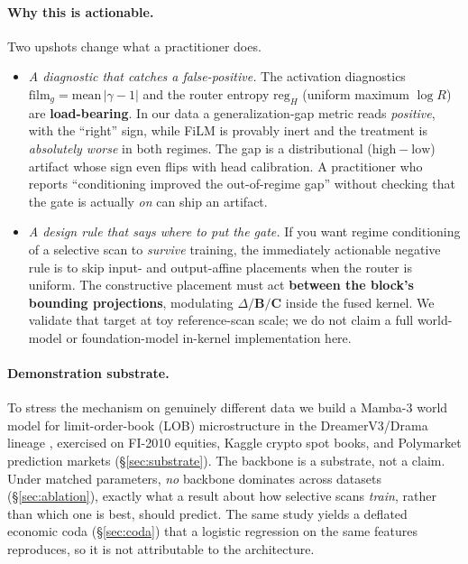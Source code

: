 \documentclass{article}
\begin{document}
\paragraph{Why this is actionable.}
Two upshots change what a practitioner does.
\begin{itemize}[nosep,leftmargin=1.4em]
\item \emph{A diagnostic that catches a false-positive.} The activation
  diagnostics $\mathrm{film}_g=\mathrm{mean}\,|\gamma-1|$ and the router entropy
  $\mathrm{reg}_H$ (uniform maximum $\log R$) are \textbf{load-bearing}. In our
  data a generalization-gap metric reads \emph{positive}, with the ``right'' sign,
  while FiLM is provably inert and the treatment is \emph{absolutely worse} in both
  regimes. The gap is a distributional ($\mathrm{high}-\mathrm{low}$) artifact
  whose sign even flips with head calibration. A practitioner who reports
  ``conditioning improved the out-of-regime gap'' without checking that the gate is
  actually \emph{on} can ship an artifact.
\item \emph{A design rule that says where to put the gate.} If you want regime
  conditioning of a selective scan to \emph{survive} training, the immediately
  actionable negative rule is to skip input- and output-affine placements when the
  router is uniform. The constructive placement must act \textbf{between the
  block's bounding projections}, modulating $\Delta/\mathbf{B}/\mathbf{C}$ inside
  the fused kernel. We validate that target at toy reference-scan scale; we do not
  claim a full world-model or foundation-model in-kernel implementation here.
\end{itemize}

\paragraph{Demonstration substrate.}
To stress the mechanism on genuinely different data we build a Mamba-3 world model
for limit-order-book (LOB) microstructure in the DreamerV3/Drama lineage
\citep{hafner2023dreamerv3, wang2024drama, lahoti2026mamba3}, exercised on FI-2010
equities, Kaggle crypto spot books, and Polymarket prediction markets
(\S\ref{sec:substrate}). The backbone is a substrate, not a claim. Under matched
parameters, \emph{no} backbone dominates across datasets (\S\ref{sec:ablation}),
exactly what a result about how selective scans \emph{train}, rather than which one
is best, should predict. The same study yields a deflated economic coda
(\S\ref{sec:coda}) that a logistic regression on the same features reproduces, so it
is not attributable to the architecture.
\end{document}
